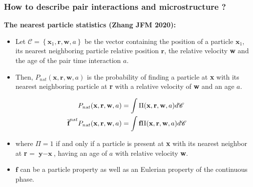 \documentclass{sintefbeamer}
\begin{document}
\begin{frame}
  \frametitle{How to describe pair interactions and microstructure ?}
  
  \textbf{The nearest particle statistics (Zhang JFM 2020): }
  \begin{definition}
    \begin{itemize}
      \item Let $\mathscr{C} =\left\{\textbf{x}_1, \textbf{r}, \textbf{w},a\right\}$ be the vector containing the position of a particle $\textbf{x}_1$, its nearest neighboring particle relative position $\textbf{r}$, the relative velocity \textbf{w} and the age of the pair time interaction $a$.
      \item Then, $P_{nst}(\textbf{x},\textbf{r},\textbf{w},a) $ is the probability of finding a particle at \textbf{x} with its nearest neighboring particle at \textbf{r} with a relative velocity of \textbf{w} and an age $a$. 
    \end{itemize}
  \end{definition}

  \begin{align*}
    P_{nst}(\textbf{x},\textbf{r},\textbf{w},a)
    &= \int \Pi(\textbf{x},\textbf{r},\textbf{w},a) d\mathscr{C}\\
    \overline{\textbf{f}}^{nst} P_{nst}(\textbf{x},\textbf{r},\textbf{w},a)
    &= \int \textbf{f} \Pi(\textbf{x},\textbf{r},\textbf{w},a) d\mathscr{C}
  \end{align*}
  \begin{itemize}
    \item 
    where $\Pi = 1$ if and only if a particle is present at \textbf{x} with its nearest neighbor at \textbf{r} = $\textbf{y}-\textbf{x}$, having an age of $a$ with relative velocity \textbf{w}. 
    \item $\textbf{f}$ can be a particle property as well as an Eulerian property of the continuous phase. 
  \end{itemize}
\end{frame}
\end{document}
